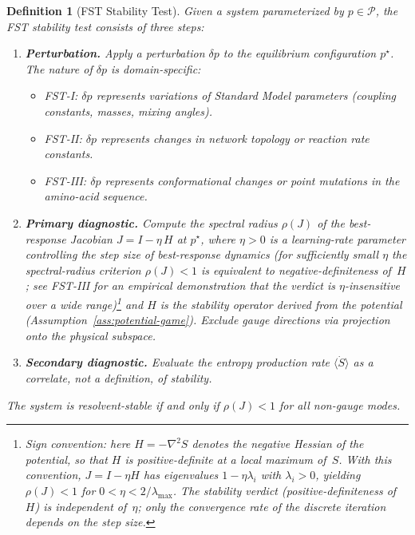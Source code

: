 \documentclass[12pt,a4paper]{article}
\newtheorem{definition}{Definition}
\theoremstyle{remark}
\begin{document}
\begin{definition}[FST Stability Test]\label{def:stability-test}
Given a system parameterized by $p \in \mathcal{P}$, the \emph{FST stability
test} consists of three steps:
\begin{enumerate}
  \item \textbf{Perturbation.} Apply a perturbation $\delta p$ to the
        equilibrium configuration $p^\star$.  The nature of $\delta p$ is
        domain-specific:
        \begin{itemize}
          \item FST-I: $\delta p$ represents variations of Standard Model
                parameters (coupling constants, masses, mixing angles).
          \item FST-II: $\delta p$ represents changes in network topology
                or reaction rate constants.
          \item FST-III: $\delta p$ represents conformational changes or
                point mutations in the amino-acid sequence.
        \end{itemize}
  \item \textbf{Primary diagnostic.} Compute the spectral radius
        $\rho(J)$ of the best-response Jacobian
        $J = I - \eta\, H$ at $p^\star$, where $\eta > 0$ is a learning-rate parameter controlling the step size of best-response dynamics (for sufficiently small $\eta$ the spectral-radius criterion $\rho(J)<1$ is equivalent to negative-definiteness of~$H$; see FST-III for an empirical demonstration that the verdict is $\eta$-insensitive over a wide range)\footnote{Sign convention: here $H = -\nabla^2 S$ denotes the \emph{negative} Hessian of the potential, so that $H$ is positive-definite at a local maximum of~$S$. With this convention, $J = I - \eta H$ has eigenvalues $1 - \eta \lambda_i$ with $\lambda_i > 0$, yielding $\rho(J) < 1$ for $0 < \eta < 2/\lambda_{\max}$. The stability verdict (positive-definiteness of~$H$) is independent of~$\eta$; only the convergence rate of the discrete iteration depends on the step size.} and $H$ is the
        stability operator derived from the potential
        (Assumption~\ref{ass:potential-game}).  Exclude gauge directions
        via projection onto the physical subspace.
  \item \textbf{Secondary diagnostic.} Evaluate the entropy production
        rate $\langle\dot{S}\rangle$ as a \emph{correlate}, not a
        definition, of stability.
\end{enumerate}
The system is \emph{resolvent-stable} if and only if $\rho(J) < 1$ for
all non-gauge modes.
\end{definition}
\end{document}
